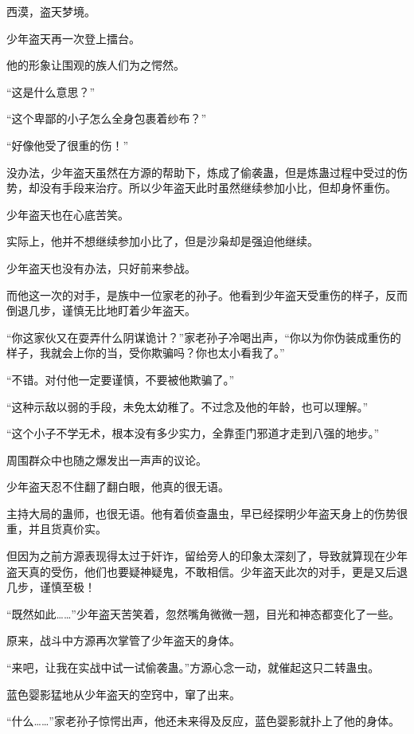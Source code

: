 
\begin{this_body}

西漠，盗天梦境。

少年盗天再一次登上擂台。

他的形象让围观的族人们为之愕然。

“这是什么意思？”

“这个卑鄙的小子怎么全身包裹着纱布？”

“好像他受了很重的伤！”

没办法，少年盗天虽然在方源的帮助下，炼成了偷袭蛊，但是炼蛊过程中受过的伤势，却没有手段来治疗。所以少年盗天此时虽然继续参加小比，但却身怀重伤。

少年盗天也在心底苦笑。

实际上，他并不想继续参加小比了，但是沙枭却是强迫他继续。

少年盗天也没有办法，只好前来参战。

而他这一次的对手，是族中一位家老的孙子。他看到少年盗天受重伤的样子，反而倒退几步，谨慎无比地盯着少年盗天。

“你这家伙又在耍弄什么阴谋诡计？”家老孙子冷喝出声，“你以为你伪装成重伤的样子，我就会上你的当，受你欺骗吗？你也太小看我了。”

“不错。对付他一定要谨慎，不要被他欺骗了。”

“这种示敌以弱的手段，未免太幼稚了。不过念及他的年龄，也可以理解。”

“这个小子不学无术，根本没有多少实力，全靠歪门邪道才走到八强的地步。”

周围群众中也随之爆发出一声声的议论。

少年盗天忍不住翻了翻白眼，他真的很无语。

主持大局的蛊师，也很无语。他有着侦查蛊虫，早已经探明少年盗天身上的伤势很重，并且货真价实。

但因为之前方源表现得太过于奸诈，留给旁人的印象太深刻了，导致就算现在少年盗天真的受伤，他们也要疑神疑鬼，不敢相信。少年盗天此次的对手，更是又后退几步，谨慎至极！

“既然如此……”少年盗天苦笑着，忽然嘴角微微一翘，目光和神态都变化了一些。

原来，战斗中方源再次掌管了少年盗天的身体。

“来吧，让我在实战中试一试偷袭蛊。”方源心念一动，就催起这只二转蛊虫。

蓝色婴影猛地从少年盗天的空窍中，窜了出来。

“什么……”家老孙子惊愕出声，他还未来得及反应，蓝色婴影就扑上了他的身体。


\end{this_body}
